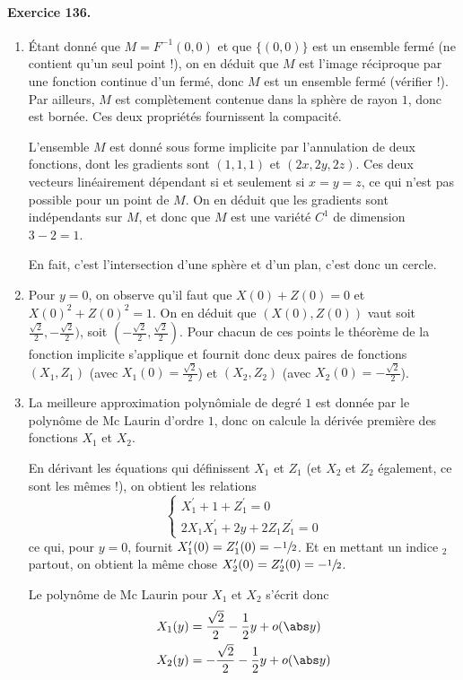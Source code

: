 \paragraph{Exercice 136.}
\begin{enumerate}
\item Étant donné que $ M = F^{-1}(0,0)$ et que $\{(0,0)\}$ est un
ensemble fermé (ne contient qu'un seul point !), on en déduit que
$ M$ est l'image réciproque par une fonction continue d'un
fermé, donc $ M$ est un ensemble fermé (vérifier !).  Par
ailleurs, $ M$ est complètement contenue dans la sphère de rayon
$1$, donc est bornée. Ces deux propriétés fournissent la compacité.

L'ensemble $ M$ est donné sous forme implicite par l'annulation
de deux fonctions, dont les gradients sont $(1,1,1)$ et $(2x,
2y,2z)$. Ces deux vecteurs linéairement dépendant si et seulement si
$x = y = z$, ce qui n'est pas possible pour un point de $ M$. On
en déduit que les gradients sont indépendants sur $ M$, et donc
que $ M$ est une variété $C^1$ de dimension $3 - 2 = 1$.

En fait, c'est l'intersection d'une sphère et d'un plan, c'est donc
un cercle.

\item Pour $y = 0$, on observe qu'il faut que $X(0) + Z(0) = 0$ et
$X(0)^2 + Z(0)^2 = 1$. On en déduit que $(X(0),Z(0))$ vaut soit
$\frac{\sqrt2}{2},-\frac{\sqrt2}{2})$, soit
$(-\frac{\sqrt2}{2},\frac{\sqrt2}{2})$. Pour chacun de ces points le
théorème de la fonction implicite s'applique et fournit donc deux
paires de fonctions $(X_1,Z_1)$ (avec $X_1(0) = \frac{\sqrt2}{2}$) et
$(X_2,Z_2)$ (avec $X_2(0) = -\frac{\sqrt2}{2}$).

\item La meilleure approximation polynômiale de degré $1$ est donnée
par le polynôme de Mc Laurin d'ordre $1$, donc on calcule la dérivée
première des fonctions $X_1$ et $X_2$.

En dérivant les équations qui définissent $X_1$ et $Z_1$ (et $X_2$
et $Z_2$ également, ce sont les mêmes !), on obtient les relations
\begin{equation*}
\begin{cases}
X_1^\prime + 1 + Z_1^\prime = 0\\
2 X_1 X_1^\prime + 2 y + 2 Z_1 Z_1^\prime = 0
\end{cases}
\end{equation*}
ce qui, pour $y = 0$, fournit $X_1^\prime(0) = Z_1^\prime(0) =
-\sfrac12$. Et en mettant un indice ${}_2$ partout, on obtient la
même chose $X_2^\prime(0) = Z_2^\prime(0) = -\sfrac12$.

Le polynôme de Mc Laurin pour $X_1$ et $X_2$ s'écrit donc
\begin{equation*}
\begin{split}
X_1(y) &= \frac{\sqrt2}{2} - \frac12 y + o(\abs y)\\
X_2(y) &= -\frac{\sqrt2}{2} - \frac12 y + o(\abs y)\\
\end{split}
\end{equation*}
\end{enumerate}

